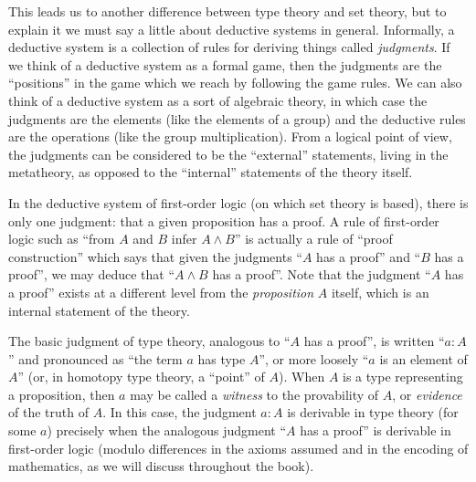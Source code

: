 {This leads us to another difference between type theory and set theory, but to explain it we must say a little about deductive systems in general.
Informally, a deductive system is a collection of rules for deriving things called \emph{judgments}.
If we think of a deductive system as a formal game, then the judgments are the ``positions'' in the game which we reach by following the game rules.
We can also think of a deductive system as a sort of algebraic theory, in which case the judgments are the elements (like the elements of a group) and the deductive rules are the operations (like the group multiplication).
From a logical point of view, the judgments can be considered to be the ``external'' statements, living in the metatheory, as opposed to the ``internal'' statements of the theory itself.

In the deductive system of first-order logic (on which set theory is based), there is only one judgment: that a given proposition has a proof.
A rule of first-order logic such as ``from $A$ and $B$ infer $A\wedge B$'' is actually a rule of ``proof construction'' which says that given the judgments ``$A$ has a proof'' and ``$B$ has a proof'', we may deduce that ``$A\wedge B$ has a proof''.
Note that the judgment ``$A$ has a proof'' exists at a different level from the \emph{proposition} $A$ itself, which is an internal statement of the theory.

The basic judgment of type theory, analogous to ``$A$ has a proof'', is written ``$a:A$'' and pronounced as ``the term $a$ has type $A$'', or more loosely ``$a$ is an element of $A$'' (or, in homotopy type theory, a ``point'' of $A$).
When $A$ is a type representing a proposition, then $a$ may be called a \emph{witness} to the provability of $A$, or \emph{evidence} of the truth of $A$.
In this case, the judgment $a:A$ is derivable in type theory (for some $a$) precisely when the analogous judgment ``$A$ has a proof'' is derivable in first-order logic (modulo differences in the axioms assumed and in the encoding of mathematics, as we will discuss throughout the book).

}
